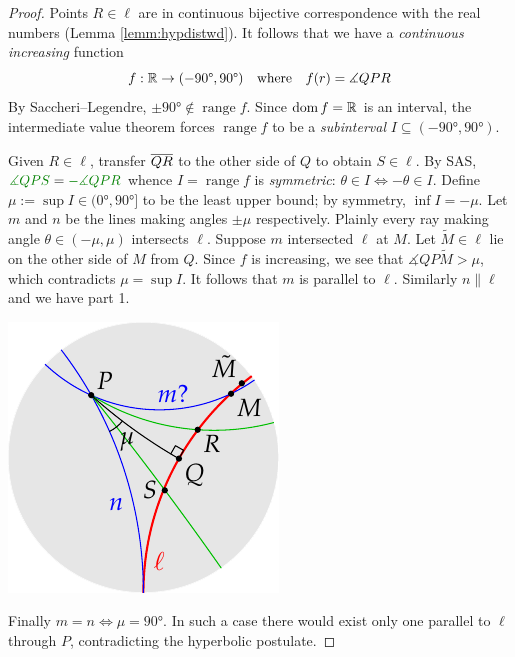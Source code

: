 \begin{proof}
	Points $R\in\ell$ are in continuous bijective correspondence with the real numbers (Lemma \ref{lemm:hypdistwd}). It follows that we have a \emph{continuous increasing} function
	\[
		f:\R\to(-\ang{90},\ang{90})\quad\text{where}\quad f(r)=\measuredangle QPR
	\]
	By Saccheri--Legendre, $\pm\ang{90}\not\in\operatorname{range}f$. Since $\dom f=\R$ is an interval, the intermediate value theorem forces $\operatorname{range}f$ to be a \emph{subinterval} $I\subseteq(-\ang{90},\ang{90})$.\par
	
	\begin{minipage}[t]{0.71\linewidth}\vspace{-6pt}
		Given $R\in\ell$, transfer $\cl{QR}$ to the other side of $Q$ to obtain $S\in\ell$. By SAS, $\textcolor{Green}{\measuredangle QPS}=\textcolor{Green}{-\measuredangle QPR}$ whence $I=\operatorname{range}f$ is \emph{symmetric}: $\theta\in I\iff -\theta\in I$.\smallbreak
	Define $\mu:=\sup I\in(\ang{0},\ang{90}]$ to be the least upper bound; by symmetry, $\inf I=-\mu$. Let $m$ and $n$ be the lines making angles $\pm\mu$ respectively. Plainly every ray making angle $\theta\in(-\mu,\mu)$ intersects $\ell$.\smallbreak
	Suppose $m$ intersected $\ell$ at $M$. Let $\tilde M\in\ell$ lie on the other side of $M$ from $Q$. Since $f$ is increasing, we see that $\measuredangle QP\tilde M>\mu$, which contradicts $\mu=\sup I$. It follows that $m$ is parallel to $\ell$. Similarly $n\parallel\ell$ and we have part 1.
	\end{minipage}
	\hfill
	\begin{minipage}[t]{0.28\linewidth}\vspace{-8pt}
		\flushright\includegraphics[scale=1]{basic-parallels5}
	\end{minipage}
	\smallbreak
	Finally $m=n\Longleftrightarrow \mu=\ang{90}$. In such a case there would exist only one parallel to $\ell$ through $P$, contradicting the hyperbolic postulate.
\end{proof}
\goodbreak


